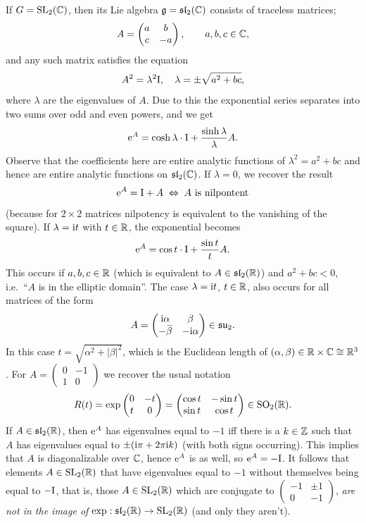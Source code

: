 \begin{example}
If $G=\operatorname{SL}_2(\mathbb{C})$, then its Lie algebra $\mathfrak{g}=\mathfrak{sl}_2(\mathbb{C})$ consists of traceless matrices;
\[A=\begin{pmatrix}
    a&b\\c&-a
\end{pmatrix},\quad \quad a,b,c\in\mathbb{C},\]
and any such matrix satisfies the equation
\[A^2=\lambda^2 \mathrm{I},\quad \lambda=\pm \sqrt{a^2+bc},\]
where $\lambda$ are the eigenvalues of $A$. Due to this the exponential series separates into two sums over odd and even powers, and we get
\[\mathrm{e}^A=\cosh \lambda \cdot \mathrm{I}+\frac{\sinh \lambda}{\lambda}A.\]
Observe that the coefficients here are entire analytic functions of $\lambda^2=a^2+bc$ and hence are entire analytic functions on $\mathfrak{sl}_2(\mathbb{C})$. If $\lambda=0$, we recover the result
\[\mathrm{e}^A=\mathrm{I}+A \; \Leftrightarrow \; A\text{ is nilpontent}\]
(because for $2\times 2$ matrices nilpotency is equivalent to the vanishing of the square). If $\lambda=\mathrm{i} t$ with $t\in \mathbb{R}$, the exponential becomes
\[\mathrm{e}^A=\cos t\cdot \mathrm{I}+\frac{\sin t}{t}A.\]
This occurs if $a,b,c\in\mathbb{R}$ (which is equivalent to $A\in\mathfrak{sl}_2(\mathbb{R})$) and $a^2+bc<0$, i.e.\ ``$A$ is in the elliptic domain''. The case $\lambda=\mathrm{i} t$, $t\in\mathbb{R}$, also occurs for all matrices of the form
\[A=\begin{pmatrix}
    \i\alpha&\beta\\-\wb{\beta}&-\i\alpha
\end{pmatrix}\in\mathfrak{su}_2.\]
In this case $t=\sqrt{\alpha^2+|\beta|^2}$, which is the Euclidean length of $(\alpha,\beta)\in\mathbb{R}\times\mathbb{C}\cong \mathbb{R}^3$. For $A=\begin{pmatrix}
    0&-1\\1&0
\end{pmatrix}$ we recover the usual notation
\[R(t)=\exp \begin{pmatrix}
    0&-t\\t&0
\end{pmatrix}=\begin{pmatrix}
    \cos t&-\sin t\\\sin t&\cos t
\end{pmatrix}\in\operatorname{SO}_2(\mathbb{R}).\]
If $A\in\mathfrak{sl}_2(\mathbb{R})$, then $\mathrm{e}^A$ has eigenvalues equal to $-1$ iff there is a $k\in\mathbb{Z}$ such that $A$ has eigenvalues equal to $\pm(\mathrm{i}\pi+2\pi \mathrm{i} k)$ (with both signs occurring). This implies that $A$ is diagonalizable over $\mathbb{C}$, hence $\mathrm{e}^A$ is as well, so $\mathrm{e}^A=-\mathrm{I}$. It follows that elements $A\in\operatorname{SL}_2(\mathbb{R})$ that have eigenvalues equal to $-1$ without themselves being equal to $-\mathrm{I}$, that is, those $A\in\operatorname{SL}_2(\mathbb{R})$ which are conjugate to $\left(\begin{smallmatrix}
    -1&\pm 1\\0&-1
\end{smallmatrix}\right)$, \emph{are not in the image of $\exp:\mathfrak{sl}_2(\mathbb{R})\to \operatorname{SL}_2(\mathbb{R})$} (and only they aren't).


\end{example}
